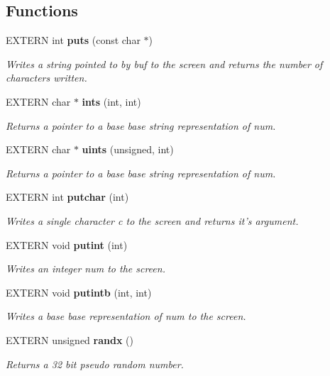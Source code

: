 \subsection*{Functions}
\begin{CompactItemize}
\item 
EXTERN int {\bf puts} (const char $\ast$)
\begin{CompactList}\small\item\em Writes a string pointed to by {\em buf} to the screen and returns the number of characters written.\item\end{CompactList}\item 
EXTERN char $\ast$ {\bf ints} (int, int)
\begin{CompactList}\small\item\em Returns a pointer to a base {\em base} string representation of {\em num}.\item\end{CompactList}\item 
EXTERN char $\ast$ {\bf uints} (unsigned, int)
\begin{CompactList}\small\item\em Returns a pointer to a base {\em base} string representation of {\em num}.\item\end{CompactList}\item 
EXTERN int {\bf putchar} (int)
\begin{CompactList}\small\item\em Writes a single character {\em c} to the screen and returns it's argument.\item\end{CompactList}\item 
EXTERN void {\bf putint} (int)
\begin{CompactList}\small\item\em Writes an integer {\em num} to the screen.\item\end{CompactList}\item 
EXTERN void {\bf putintb} (int, int)
\begin{CompactList}\small\item\em Writes a base {\em base} representation of {\em num} to the screen.\item\end{CompactList}\item 
EXTERN unsigned {\bf randx} ()
\begin{CompactList}\small\item\em Returns a 32 bit pseudo random number.\item\end{CompactList}\item 

\end{CompactItemize}
